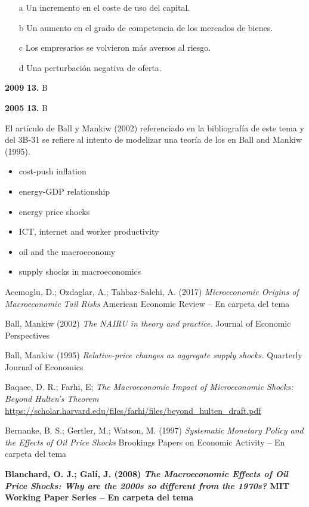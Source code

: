 \documentclass{nuevotema}
\begin{document}
\begin{itemize}
	\item[a] Un incremento en el coste de uso del capital.
	\item[b] Un aumento en el grado de competencia de los mercados de bienes.
	\item[c] Los empresarios se volvieron más aversos al riesgo.
	\item[d] Una perturbación negativa de oferta.
\end{itemize}

\notas

\textbf{2009} \textbf{13.} B

\textbf{2005} \textbf{13.} B

El artículo de Ball y Mankiw (2002) referenciado en la bibliografía de este tema y del 3B-31 se refiere al intento de modelizar una teoría de los  en Ball and Mankiw (1995).

\bibliografia

\begin{itemize}
	\item cost-push inflation
	\item energy-GDP relationship
	\item energy price shocks
	\item ICT, internet and worker productivity
	\item oil and the macroeconomy
	\item supply shocks in macroeconomics
\end{itemize}

Acemoglu, D.; Ozdaglar, A.; Tahbaz-Salehi, A. (2017) \textit{Microeconomic Origins of Macroeconomic Tail Risks} American Economic Review -- En carpeta del tema

Ball, Mankiw (2002) \textit{The NAIRU in theory and practice.} Journal of Economic Perspectives

Ball, Mankiw (1995) \textit{Relative-price changes as aggregate supply shocks.} Quarterly Journal of Economics

Baqaee, D. R.; Farhi, E; \textit{The Macroeconomic Impact of Microeconomic
Shocks: Beyond Hulten’s Theorem} \url{https://scholar.harvard.edu/files/farhi/files/beyond_hulten_draft.pdf}

Bernanke, B. S.; Gertler, M.; Watson, M. (1997) \textit{Systematic Monetary Policy and the Effects of Oil Price Shocks} Brookings Papers on Economic Activity -- En carpeta del tema

\textbf{Blanchard, O. J.; Galí, J. (2008) \textit{The Macroeconomic Effects of Oil Price Shocks: Why are the 2000s so different from the 1970s?} MIT Working Paper Series -- En carpeta del tema}
\end{document}
